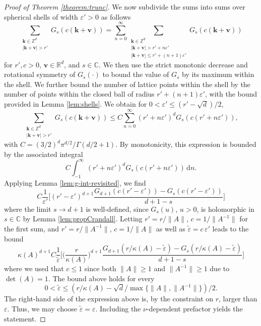\documentclass[]{amsart}
\numberwithin{mythm}{section}
\begin{document}
\begin{proof}[Proof of Theorem \ref{theorem:trunc}]
We now subdivide the sums into sums over spherical shells of width 
$\varepsilon'>0$ as follows
$$\sum_{\substack{\bm k\in \mathds Z^d\\ |\bm k + \bm v|> r'}}G_{s}
(c(\bm{k} + \bm v)) = \sum_{n = 0}^\infty \sum_{\substack{\bm k\in \mathds Z^d\\ |\bm k + \bm v|> r'+n\varepsilon'\\|\bm k + \bm v|\le  r'+(n+1)\varepsilon' }} G_{s}
(c(\bm{k} + \bm v)) 
$$
for
$r',c>0$, $\bm v\in\mathds R^d$, and $s\in \mathds C$.
We then use the strict monotonic decrease and rotational symmetry of $G_s(\cdot)$ to bound the value of $G_s$ by its maximum within the shell. We further bound the number of lattice points within the shell by the number of points within the closed ball of radius $r'+(n+1)\varepsilon'$, with the bound provided in 
Lemma \ref{lem:shells}. We obtain for 
$0<\varepsilon'\le (r'-\sqrt{d})/2$,
$$
\sum_{\substack{\bm k\in \mathds Z^d\\ |\bm k + \bm v|> r'}}G_{s}
(c(\bm{k} + \bm v))
\le
C\sum_{n=0}^{\infty}
(r'+n\varepsilon')^d
G_{s}
(c(r'+n\varepsilon')),
$$
with $C=(3/2)^d\pi^{d/2}/\Gamma(d/2+1)$.
By monotonicity,
this expression is bounded by the associated integral
$$
C\int_{-1}^{\infty}
(r'+n\varepsilon')^d
G_{s}
(c(r'+n\varepsilon'))\,\mathrm d n.
$$
Applying 
Lemma \ref{lem:g-int-revisited}, we find
$$
C
\frac 1{\varepsilon'}\Big[(r'-\varepsilon')^{d+1}
\frac{G_{d+1}(c(r'-\varepsilon')) - G_s(c(r'-\varepsilon'))}{d+1-s}
\Big]
$$
where the limit $s\to d+1$  is well-defined, since $G_{s}(u)$, $u>0$,
is holomorphic in $s\in\mathds C$ by 
Lemma \ref{lem:propCrandall}.
Letting
 $r'=r/\|A\|$, $c=1/\|A^{-1}\|$
 for the first sum, and $r'=r/\|A^{-1}\|$, $c=1/\|A\|$
 as well as $\tilde\varepsilon=c \,\varepsilon'$
 leads to the bound
$$
\kappa(A)^{d+1}C
\frac 1{\tilde\varepsilon}\Big[
\Big(\frac r{\kappa(A)}\Big)^{d+1}
\frac{G_{d+1}(r/\kappa(A)-\tilde\varepsilon) - G_s(r/\kappa(A)-\tilde\varepsilon)}{d+1-s}
\Big]
$$
where we used that $c\le 1$ since both $\|A\|\ge 1$ and $\|A^{-1}\|\ge 1$ due to $\det(A)=1$.
The bound above holds
for every
$$
0<\tilde\varepsilon\le 
(r/\kappa(A)-\sqrt{d}/\max\{\|A\|,\|A^{-1}\|\})/2.
$$
The right-hand side of the expression above is, by the constraint on $r$, larger than $\varepsilon$.
Thus, we may choose $\tilde{\varepsilon}=\varepsilon$.
Including the $\nu$-dependent prefactor yields the statement.
\end{proof}

\printbibliography
\end{document}
